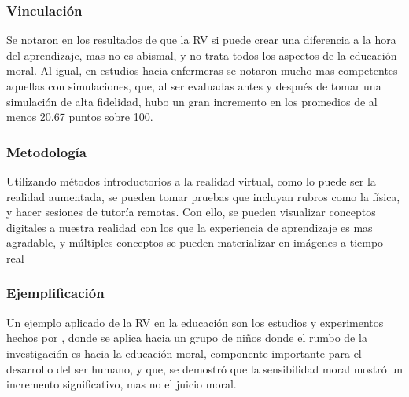 \subsubsection{Vinculación}

Se notaron en los resultados de \cite{SHIM2023100010} que la RV si puede crear una diferencia a la hora del aprendizaje, mas no es abismal, y no trata todos los aspectos de la educación moral. Al igual, en estudios hacia enfermeras se notaron mucho mas competentes aquellas con simulaciones, que, al ser evaluadas antes y después de tomar una simulación de alta fidelidad, hubo un gran incremento en los promedios de al menos 20.67 puntos sobre 100. \parencite{GUERRERO2022100002}

\subsubsection{Metodología}
Utilizando métodos introductorios a la realidad virtual, como lo puede ser la realidad aumentada, se pueden tomar pruebas que incluyan rubros como la física, y hacer sesiones de tutoría remotas. Con ello, se pueden visualizar conceptos digitales a nuestra realidad con los que la experiencia de aprendizaje es mas agradable, y múltiples conceptos se pueden materializar en imágenes a tiempo real \parencite{RADU2023100011}



\subsubsection{Ejemplificación}

Un ejemplo aplicado de la RV en la educación son los estudios y experimentos hechos por \parencite{SHIM2023100010}, donde se aplica hacia un grupo de niños donde el rumbo de la investigación es hacia la educación moral, componente importante para el desarrollo del ser humano, y que, se demostró que la sensibilidad moral mostró un incremento significativo, mas no el juicio moral.
